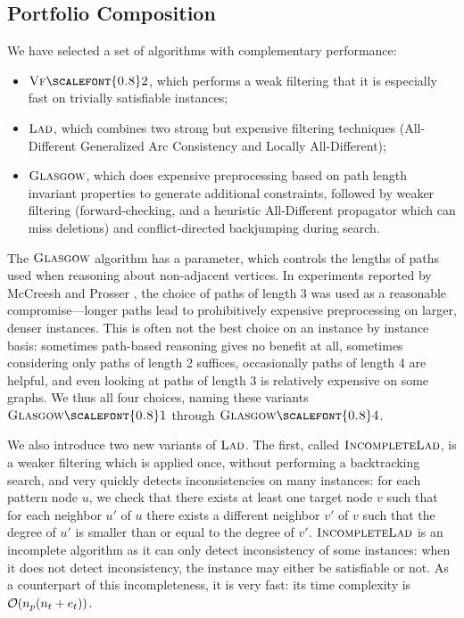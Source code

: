 \documentclass{llncs}
\newcommand{\VFtwo}{$\textsc{Vf{\scalefont{0.8}2}}$\xspace}
\newcommand{\Glasgow}{$\textsc{Glasgow}$\xspace}
\newcommand{\LAD}{$\textsc{Lad}$\xspace}
\newcommand{\IncompleteLAD}{$\textsc{IncompleteLad}$\xspace}
\newcommand{\GlasgowOne}{$\textsc{Glasgow{\scalefont{0.8}1}}$\xspace}
\newcommand{\GlasgowFour}{$\textsc{Glasgow{\scalefont{0.8}4}}$\xspace}
\begin{document}
\subsection{Portfolio Composition}

We have selected a set of algorithms with complementary performance:
\begin{itemize}
\item \VFtwo \cite{Cordella:2004}, which performs a weak filtering that it is especially fast on
    trivially satisfiable instances;
\item \LAD \cite{Solnon:2010}, which combines two strong but expensive filtering techniques
    (All-Different Generalized Arc Consistency and Locally All-Different);
\item \Glasgow \cite{McCreesh:2015}, which does expensive preprocessing based on path length
    invariant properties to generate additional constraints, followed by weaker filtering
    (forward-checking, and a heuristic All-Different propagator which can miss deletions) and
    conflict-directed backjumping during search.
\end{itemize}

\noindent The \Glasgow algorithm has a parameter, which controls the lengths of paths used when
reasoning about non-adjacent vertices.  In experiments reported by McCreesh and Prosser
\cite{McCreesh:2015}, the choice of paths of length 3 was used as a reasonable compromise---longer
paths lead to prohibitively expensive preprocessing on larger, denser instances. This is often not
the best choice on an instance by instance basis: sometimes path-based reasoning gives no benefit at
all, sometimes considering only paths of length 2 suffices, occasionally paths of length 4 are
helpful, and even looking at paths of length 3 is relatively expensive on some graphs. We thus all
four choices, naming these variants \GlasgowOne through \GlasgowFour.

We also introduce two new variants of \LAD. The first, called \IncompleteLAD, is a weaker
filtering which is applied once, without performing a backtracking search, and very quickly
detects inconsistencies on many instances: for each pattern node $u$, we check that there exists at
least one target node $v$ such that for each neighbor $u'$ of $u$ there exists a different neighbor
$v'$ of $v$ such that the degree of $u'$ is smaller than or equal to the degree of $v'$.
\IncompleteLAD is an incomplete algorithm as it can only detect inconsistency of some instances: when
it does not detect inconsistency, the instance may either be satisfiable or not. As a counterpart of
this incompleteness, it is very fast: its time complexity is ${\cal O}(n_p(n_t+e_t))$.
\end{document}
